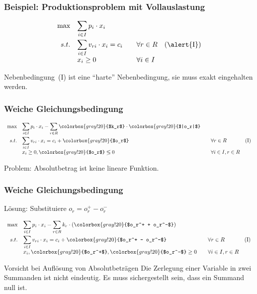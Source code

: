 \begin{frame}
 \frametitle{Beispiel: Produktionsproblem mit Vollauslastung}
 \begin{equation*}
  \begin{array}{rllr}
    \max & \displaystyle\sum_{i\in I} p_i\cdot x_i & & \\[3ex]
    s.t. & \displaystyle\sum_{i\in I} v_{ri}\cdot x_i = c_i & \quad\forall r\in R & \mathrm{(\alert{I})}\\
	  & x_i \geq 0 & \quad\forall i\in I & \\
  \end{array}
 \end{equation*}
 
 Nebenbedingung~\textrm{(\alert{I})} ist eine "`harte"' Nebenbedingung, sie muss exakt eingehalten werden.
\end{frame}

\begin{frame}
 \frametitle{Weiche Gleichungsbedingung}
  \begin{equation*}
    \begin{array}{rllr}
      \max & \displaystyle\sum_{i\in I} p_i\cdot x_i - \sum_{r\in R} \colorbox{gray!20}{$k_r$} \cdot \colorbox{gray!20}{$|o_r|$} & & \\[3ex]
      s.t. & \displaystyle\sum_{i\in I} v_{ri}\cdot x_i = c_i + \colorbox{gray!20}{$o_r$} & \quad\forall r\in R & \mathrm{(I)}\\
	    & x_i \geq 0, \colorbox{gray!20}{$o_r$} \lessgtr0 & \quad\forall i\in I, r\in R & \\
    \end{array}
  \end{equation*}
 
 Problem: Absolutbetrag ist keine lineare Funktion.
\end{frame}

\begin{frame}
 \frametitle{Weiche Gleichungsbedingung}
  Lösung: Substituiere $o_r = o_r^+ - o_r^-$
  
  \begin{equation*}
    \begin{array}{rllr}
      \max & \displaystyle\sum_{i\in I} p_i\cdot x_i - \sum_{r\in R} k_r \cdot (\colorbox{gray!20}{$o_r^+ + o_r^-$}) & & \\[3ex]
      s.t. & \displaystyle\sum_{i\in I} v_{ri}\cdot x_i = c_i + \colorbox{gray!20}{$o_r^+ - o_r^-$} & \quad\forall r\in R & \mathrm{(I)}\\
	    & x_i, \colorbox{gray!20}{$o_r^+$}, \colorbox{gray!20}{$o_r^-$} \geq 0 & \quad\forall i\in I, r\in R & \\
    \end{array}
  \end{equation*}
  
  \begin{alertblock}{Vorsicht bei Auflösung von Absolutbeträgen}
   Die Zerlegung einer Variable in zwei Summanden ist nicht eindeutig. Es muss sichergestellt sein, dass ein Summand null ist.
  \end{alertblock}
\end{frame}

